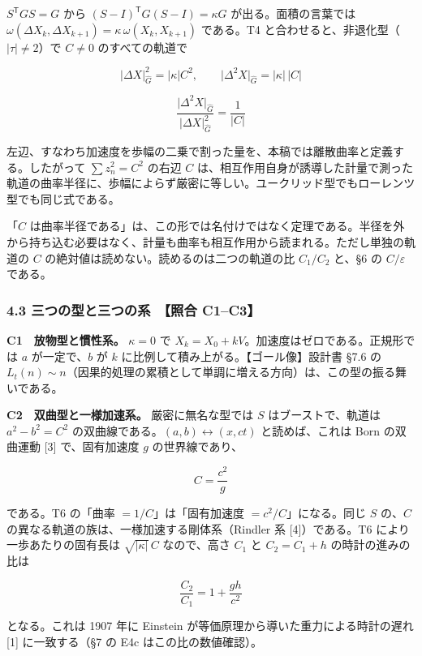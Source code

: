 \documentclass[
  a4paper,
]{ltjsarticle}
\begin{document}
\(S^{\mathsf T}GS=G\) から \((S-I)^{\mathsf T}G(S-I)=\kappa G\)
が出る。面積の言葉では
\(\omega(\Delta X_k,\Delta X_{k+1})=\kappa\,\omega(X_k,X_{k+1})\)
である。T4 と合わせると、非退化型（\(\lvert\tau\rvert\neq2\)）で
\(C\neq0\) のすべての軌道で

\[
\lvert\Delta X\rvert_{\hat G}^2=\lvert\kappa\rvert C^2,\qquad\lvert\Delta^2X\rvert_{\hat G}=\lvert\kappa\rvert\,\lvert C\rvert
\]

\[
\boxed{\;\frac{\lvert\Delta^2X\rvert_{\hat G}}{\lvert\Delta X\rvert_{\hat G}^{2}}=\frac{1}{\lvert C\rvert}\;}
\]

左辺、すなわち加速度を歩幅の二乗で割った量を、本稿では離散曲率と定義する。したがって
\(\sum z_n^2=C^2\) の右辺 \(C\)
は、相互作用自身が誘導した計量で測った軌道の曲率半径に、歩幅によらず厳密に等しい。ユークリッド型でもローレンツ型でも同じ式である。

「\(C\)
は曲率半径である」は、この形では名付けではなく定理である。半径を外から持ち込む必要はなく、計量も曲率も相互作用から読まれる。ただし単独の軌道の
\(C\) の絶対値は読めない。読めるのは二つの軌道の比 \(C_1/C_2\) と、§6 の
\(C/\varepsilon\) である。

\subsubsection{4.3 三つの型と三つの系　【照合
C1--C3】}\label{ux4e09ux3064ux306eux578bux3068ux4e09ux3064ux306eux7cfb-ux7167ux5408-c1c3}

\textbf{C1　放物型と慣性系。} \(\kappa=0\) で
\(X_k=X_0+kV\)。加速度はゼロである。正規形では \(a\) が一定で、\(b\) が
\(k\) に比例して積み上がる。【ゴール像】設計書 §7.6 の
\(L_t(n)\sim n\)（因果的処理の累積として単調に増える方向）は、この型の振る舞いである。

\textbf{C2　双曲型と一様加速系。} 厳密に無名な型では \(S\)
はブーストで、軌道は \(a^2-b^2=C^2\)
の双曲線である。\((a,b)\leftrightarrow(x,ct)\) と読めば、これは Born
の双曲運動 {[}3{]} で、固有加速度 \(g\) の世界線であり、

\[
\boxed{\;C=\frac{c^2}{g}\;}
\]

である。T6 の「曲率 \(=1/C\)」は「固有加速度 \(=c^2/C\)」になる。同じ
\(S\) の、\(C\) の異なる軌道の族は、一様加速する剛体系（Rindler 系
{[}4{]}）である。T6 により一歩あたりの固有長は
\(\sqrt{\lvert\kappa\rvert}\,C\) なので、高さ \(C_1\) と \(C_2=C_1+h\)
の時計の進みの比は

\[
\frac{C_2}{C_1}=1+\frac{gh}{c^2}
\]

となる。これは 1907 年に Einstein
が等価原理から導いた重力による時計の遅れ {[}1{]} に一致する（§7 の E4c
はこの比の数値確認）。
\end{document}
